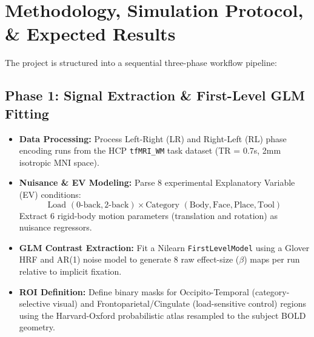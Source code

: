 \documentclass[11pt,a4paper]{article}
\begin{document}
\section{Methodology, Simulation Protocol, \& Expected Results}

The project is structured into a sequential three-phase workflow pipeline:

\begin{center}
\end{center}

\subsection{Phase 1: Signal Extraction \& First-Level GLM Fitting}

\begin{itemize}
    \item \textbf{Data Processing:} Process Left-Right (LR) and Right-Left (RL) phase encoding runs from the HCP \texttt{tfMRI\_WM} task dataset (TR = 0.7s, 2mm isotropic MNI space).
    \item \textbf{Nuisance \& EV Modeling:} Parse 8 experimental Explanatory Variable (EV) conditions:
    \[
    \text{Load } (0\text{-back}, 2\text{-back}) \times \text{Category } (\text{Body}, \text{Face}, \text{Place}, \text{Tool})
    \]
    Extract 6 rigid-body motion parameters (translation and rotation) as nuisance regressors.
    \item \textbf{GLM Contrast Extraction:} Fit a Nilearn \texttt{FirstLevelModel} using a Glover HRF and AR(1) noise model to generate 8 raw effect-size ($\beta$) maps per run relative to implicit fixation.
    \item \textbf{ROI Definition:} Define binary masks for Occipito-Temporal (category-selective visual) and Frontoparietal/Cingulate (load-sensitive control) regions using the Harvard-Oxford probabilistic atlas resampled to the subject BOLD geometry.
\end{itemize}
\end{document}
